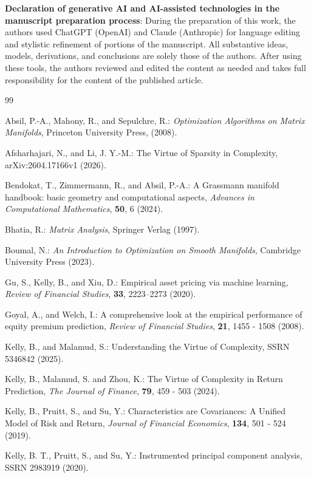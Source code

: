 \documentclass[11pt,letterpaper]{article}
\begin{document}
\medskip\noindent
\textbf{Declaration of generative AI and AI-assisted technologies in the manuscript preparation process}: During the preparation of this work, the authors used ChatGPT (OpenAI) and Claude (Anthropic) for language editing and stylistic refinement of portions of the manuscript. All substantive ideas, models, derivations, and conclusions are solely those of the authors. After using these tools, the authors reviewed and edited the content as needed and takes full responsibility for the
content of the published article.


\begin{thebibliography}{99}
	
 Absil, P.-A., Mahony, R., and Sepulchre, R.: \emph{Optimization Algorithms on Matrix Manifolds}, Princeton University Press, (2008).

 Afsharhajari, N., and Li, J. Y.-M.: The Virtue of Sparsity in Complexity, arXiv:2604.17166v1 (2026).

 Bendokat, T., Zimmermann, R., and Absil, P.-A.:  A Grassmann manifold handbook: basic geometry and computational aspects, \emph{Advances in Computational Mathematics}, \textbf{50}, 6 (2024).

 Bhatia, R.: \emph{Matrix Analysis}, Springer Verlag (1997).

 Boumal, N.: {\em An Introduction to Optimization on Smooth Manifolds}, Cambridge University Press (2023).

 Gu, S., Kelly, B., and Xiu, D.: Empirical asset pricing via machine learning, {\em Review of Financial Studies}, \textbf{33}, 2223--2273 (2020).

 Goyal, A., and Welch, I.: A comprehensive look at the empirical performance of equity premium prediction, \textit{Review of Financial Studies}, \textbf{21}, 1455 - 1508 (2008).

 Kelly, B., and Malamud, S.: Understanding the Virtue of Complexity, SSRN 5346842 (2025).

 Kelly, B., Malamud, S. and Zhou, K.: The Virtue of Complexity in Return Prediction, \textit{The Journal of Finance}, \textbf{79}, 459 - 503 (2024).

 Kelly, B., Pruitt, S., and Su, Y.: Characteristics are Covariances: A Unified Model of Risk and Return, \emph{Journal of Financial Economics}, \textbf{134}, 501 - 524 (2019).

 Kelly, B. T., Pruitt, S., and Su, Y.: Instrumented principal component analysis, SSRN 2983919 (2020).


\end{thebibliography}
\end{document}
